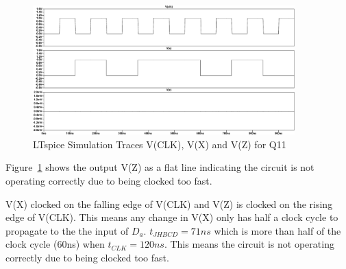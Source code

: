\begin{figure}[!ht]
    \centering
    \includegraphics[width=0.9\textwidth]{inc/Q/Q11/Q11.pdf}
    \caption{LTspice Simulation Traces V(CLK), V(X) and V(Z) for Q11}\label{fig:Q11}
\end{figure}\FloatBarrier 

    Figure~\ref{fig:Q11} shows the output V(Z) as a flat line indicating the circuit is not operating correctly due to being clocked too fast.

    V(X) clocked on the falling edge of V(CLK) and V(Z) is clocked on the rising edge of V(CLK). This means any change in V(X) only has half a clock cycle to propagate to the the input of $D_{a}$. $t_{JHBCD} = 71ns$ which is more than half of the clock cycle (60ns) when $ t_{CLK} = 120ns $. This means the circuit is not operating correctly due to being clocked too fast.